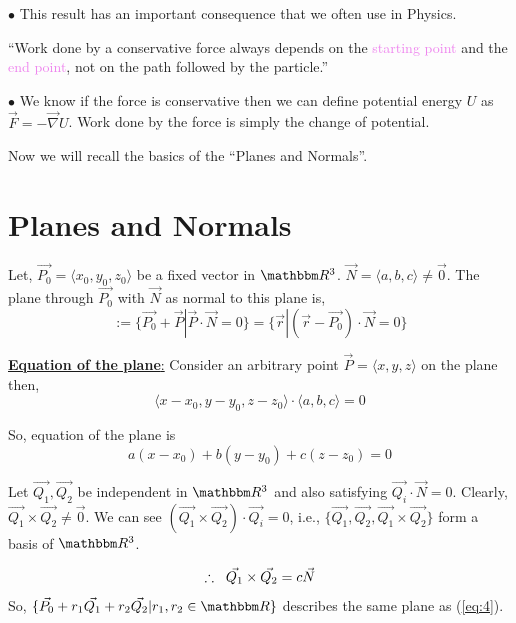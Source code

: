 \documentclass[../Analysis-3]{subfiles}
\begin{document}
$\bullet$ This result has an important consequence that we often use in Physics.

``Work done by a conservative force always depends on the \textcolor{violet}{starting point} and the \textcolor{violet}{end point}, not on the path followed by the particle.''
\vspace*{0.2cm}

$\bullet$ We know if the force is conservative then we can define potential energy $U$ as $ \vec{F} = -\vec{\nabla}U$. Work done by the force is simply the change of potential.

\vspace*{0.2cm}

Now we will recall the basics of the ``Planes and Normals''.

\vspace*{0.2cm}

\section{Planes and Normals}
Let, $\vec{P_0} = \langle x_0,y_0,z_0 \rangle$ be a fixed vector in $\R^3$. $\vec{N} = \langle a,b,c \rangle \neq \vec{0}$. The plane through $\vec{P_0}$ with $\vec{N}$ as normal to this plane is,
$$ := \{\vec{P_0} + \vec{P} | \vec{P}\cdot \vec{N} = 0\} = \{\vec{r} | (\vec{r}-\vec{P_0})\cdot \vec{N} = 0 \} $$

\underline{\textbf{Equation of the plane}:} Consider an arbitrary point $\vec{P} = \langle x,y,z\rangle$ on the plane then, $$\langle x-x_0,y-y_0,z-z_0\rangle \cdot \langle a,b,c \rangle = 0$$

So, equation of the plane is
\begin{equation}
    a(x-x_0)+b(y-y_0) +c(z-z_0)= 0 \label{eq:4}
\end{equation}

\vspace{1cm}

Let $\vec{Q_1},\vec{Q_2}$ be independent in $\R^3$ and also satisfying $\vec{Q_i} \cdot \vec{N} = 0$. Clearly, $\vec{Q_1}\times \vec{Q_2} \neq \vec{0}$. We can see $(\vec{Q_1}\times \vec{Q_2}) \cdot \vec{Q_i} = 0$, i.e., $\{\vec{Q_1},\vec{Q_2},\vec{Q_1}\times \vec{Q_2}\}$ form a basis of $\R^3$.

$$\therefore \hspace{0.2cm}\vec{Q_1}\times \vec{Q_2} = c \vec{N}$$
So, $\{\vec{P_0} + r_1 \vec{Q_1} + r_2 \vec{Q_2} | r_1,r_2 \in \R \}$ describes the same plane as (\ref{eq:4}).
\end{document}
